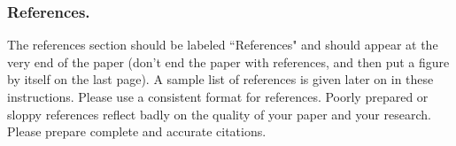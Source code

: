 \documentclass[letterpaper]{article} %
\begin{document}






\subsubsection{References.}
The references section should be labeled ``References" and should appear at the very end of the paper (don't end the paper with references, and then put a figure by itself on the last page). A sample list of references is given later on in these instructions. Please use a consistent format for references. Poorly prepared or sloppy references reflect badly on the quality of your paper and your research. Please prepare complete and accurate citations.


\end{document}
